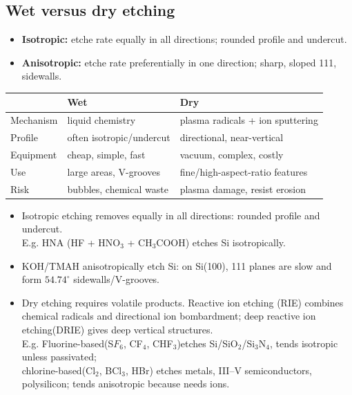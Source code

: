 \documentclass[10pt,a4paper]{ctexart}
\newcommand{\key}[1]{\textbf{#1}}
\begin{document}
\begin{multicols*}{2}
\subsection{Wet versus dry etching}
\begin{itemize}
	\item \key{Isotropic:} etche rate equally in all directions; rounded profile and undercut.
	\item \key{Anisotropic:} etche rate preferentially in one direction; sharp, sloped {111}, sidewalls.
\end{itemize}
\begin{center}\small
\begin{tabularx}{\linewidth}{@{}lYY@{}}
\toprule & Wet & Dry\\ \midrule
Mechanism & liquid chemistry & plasma radicals + ion sputtering\\
Profile & often isotropic/undercut & directional, near-vertical\\
Equipment & cheap, simple, fast & vacuum, complex, costly\\
Use & large areas, V-grooves & fine/high-aspect-ratio features\\
Risk & bubbles, chemical waste & plasma damage, resist erosion\\
\bottomrule
\end{tabularx}\end{center}
\begin{itemize}
	\item Isotropic etching removes equally in all directions: rounded profile and undercut.\\ 
	E.g. HNA (HF + HNO$_3$ + CH$_3$COOH) etches Si isotropically.
	\item KOH/TMAH anisotropically etch Si: on Si(100), {111} planes are slow and form \(54.74^\circ\) sidewalls/V-grooves.
	\item Dry etching requires volatile products. Reactive ion etching (RIE) combines chemical radicals and directional ion bombardment; 
	deep reactive ion etching(DRIE) gives deep vertical structures.\\
	E.g. Fluorine-based(S$F_6$, CF$_4$, CHF$_3$)etches Si/SiO$_2$/Si$_3$N$_4$, tends isotropic unless passivated; \\
	chlorine-based(Cl$_2$, BCl$_3$, HBr) etches metals, III–V semiconductors, polysilicon; tends anisotropic because needs ions.
\end{itemize}


\end{multicols*}
\end{document}
